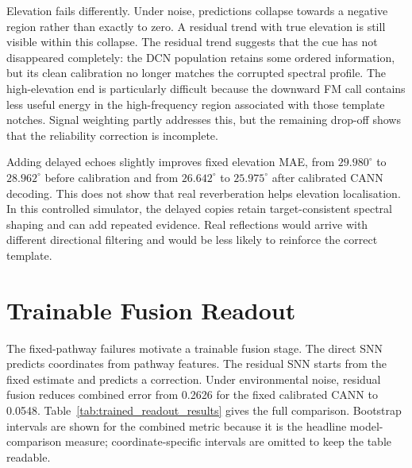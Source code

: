 Elevation fails differently. Under noise, predictions collapse towards a negative region rather than exactly to zero. A residual trend with true elevation is still visible within this collapse. The residual trend suggests that the cue has not disappeared completely: the DCN population retains some ordered information, but its clean calibration no longer matches the corrupted spectral profile. The high-elevation end is particularly difficult because the downward FM call contains less useful energy in the high-frequency region associated with those template notches. Signal weighting partly addresses this, but the remaining drop-off shows that the reliability correction is incomplete.

Adding delayed echoes slightly improves fixed elevation MAE, from $29.980^\circ$ to $28.962^\circ$ before calibration and from $26.642^\circ$ to $25.975^\circ$ after calibrated CANN decoding. This does not show that real reverberation helps elevation localisation. In this controlled simulator, the delayed copies retain target-consistent spectral shaping and can add repeated evidence. Real reflections would arrive with different directional filtering and would be less likely to reinforce the correct template.

\section{Trainable Fusion Readout}

The fixed-pathway failures motivate a trainable fusion stage. The direct SNN predicts coordinates from pathway features. The residual SNN starts from the fixed estimate and predicts a correction. Under environmental noise, residual fusion reduces combined error from 0.2626 for the fixed calibrated CANN to 0.0548. Table~\ref{tab:trained_readout_results} gives the full comparison. Bootstrap intervals are shown for the combined metric because it is the headline model-comparison measure; coordinate-specific intervals are omitted to keep the table readable.

